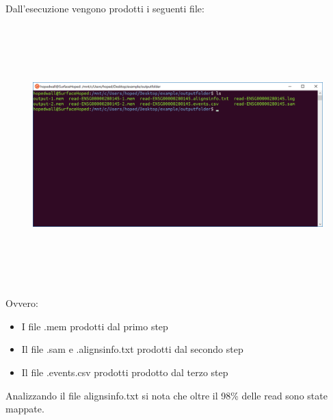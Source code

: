 Dall'esecuzione vengono prodotti i seguenti file:

\begin{figure}[h!]
	\centering
	\includegraphics[width=\linewidth,height=10cm]{images/fileprodotti.png}
  \label{fig:ProducedFiles}
\end{figure}

Ovvero:

\begin{itemize}
	\item I file .mem prodotti dal primo step
	\item Il file .sam e .alignsinfo.txt prodotti dal secondo step
	\item	Il file .events.csv prodotti prodotto dal terzo step
\end{itemize}

%
%

Analizzando il file alignsinfo.txt si nota che oltre il 98\% delle read sono state mappate.

